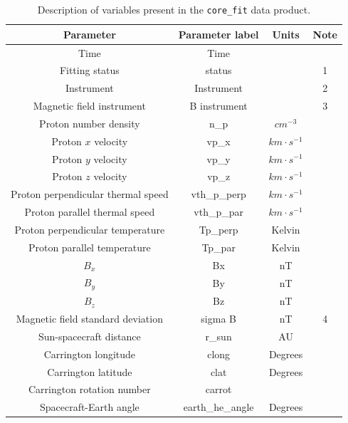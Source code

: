 \documentclass[11pt,a4paper]{article}
\begin{document}
\begin{table}
	\centering
	\begin{tabular}{| c | c | c | c |}
		\hline
		Parameter 					& Parameter label	& Units			& Note 				\\ \hline \hline \hline
		Time						 	& Time			& 				& 			\\ \hline
		Fitting status					& status			& 				& 1	\\ \hline
		Instrument		 			& Instrument		& 				& 2	\\ \hline
		Magnetic field instrument			& B instrument		&				& 3	\\ \hline \hline
		Proton number density 			& n\_p			& $cm^{-3}$		&	\\ \hline
		Proton $x$ velocity		 		& vp\_x			& $km\cdot s^{-1}$	& \\ \hline
		Proton $y$ velocity		 		& vp\_y			& $km\cdot s^{-1}$	& \\ \hline
		Proton $z$ velocity		 		& vp\_z			& $km\cdot s^{-1}$	&\\ \hline
		Proton perpendicular thermal speed 	& vth\_p\_perp		& $km\cdot s^{-1}$	&\\ \hline
		Proton parallel thermal speed 		& vth\_p\_par		& $km\cdot s^{-1}$	&\\ \hline
		Proton perpendicular temperature	& Tp\_perp		& Kelvin			&	\\ \hline
		Proton parallel temperature	 	& Tp\_par			& Kelvin			&	\\ \hline \hline
		$B_{x}$						& Bx				& nT				& 	\\ \hline
		$B_{y}$						& By				& nT				& 	\\ \hline
		$B_{z}$						& Bz				& nT				& 	\\ \hline
		Magnetic field standard deviation	& sigma B			& nT				& 4	\\ \hline \hline
		Sun-spacecraft distance			& r\_sun			& AU				&\\ \hline
		Carrington longitude				& clong			& Degrees		&	\\ \hline
		Carrington latitude				& clat			& Degrees		&	\\ \hline
		Carrington rotation number		& carrot			&				&	\\ \hline
		Spacecraft-Earth angle			& earth\_he\_angle	& Degrees		&	\\ \hline
	\end{tabular}
	\caption{Description of variables present in the \texttt{core\_fit} data product.}	
	\label{tab:variables}
	\small
	\begin{enumerate}

\end{enumerate}
\end{table}
\end{document}
